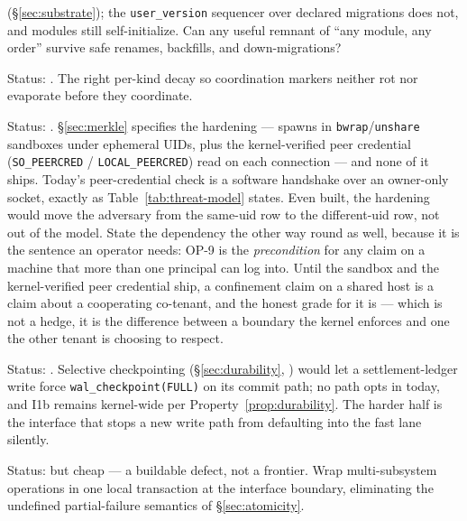 \documentclass[11pt,a4paper]{article}
\theoremstyle{definition}
\theoremstyle{remark}
\begin{document}
\begin{description}[leftmargin=2.2em,style=nextline]
(\S\ref{sec:substrate}); the \texttt{user\_version} sequencer over declared
migrations does not, and modules still self-initialize. Can any useful remnant of
``any module, any order'' survive safe renames, backfills, and down-migrations?
\item[$\bigstar$ OP-8 --- Stigmergic decay calibration.] Status: \Open. The right per-kind
decay so coordination markers neither rot nor evaporate before they coordinate.
\item[$\bigstar$ OP-9 --- Same-machine adversary.] Status: \Open. \S\ref{sec:merkle}
specifies the hardening --- spawns in \texttt{bwrap}/\texttt{unshare} sandboxes
under ephemeral UIDs, plus the kernel-verified peer credential
(\texttt{SO\_PEERCRED} / \texttt{LOCAL\_PEERCRED}) read on each connection --- and
none of it ships. Today's peer-credential check is a software handshake over an
owner-only socket, exactly as Table~\ref{tab:threat-model} states. Even built, the
hardening would move the adversary from the same-uid row to the different-uid row,
not out of the model. State the dependency the other way round as well, because it
is the sentence an operator needs: OP-9 is the \emph{precondition} for any
 claim on a machine that more than one principal can log into.
Until the sandbox and the kernel-verified peer credential ship, a confinement claim
on a shared host is a claim about a cooperating co-tenant, and the honest grade for
it is  --- which is not a hedge, it is the difference between
a boundary the kernel enforces and one the other tenant is choosing to respect.
\item[$\bigstar$ OP-10 --- Per-write-path durability.] Status: \Open. Selective
checkpointing (\S\ref{sec:durability}, \Designed) would let a settlement-ledger
write force \texttt{wal\_checkpoint(FULL)} on its commit path; no path opts in
today, and I1b remains \NotGuar{} kernel-wide per Property~\ref{prop:durability}.
The harder half is the interface that stops a new write path from defaulting into
the fast lane silently.
\item[$\bigstar$ OP-11 --- Cross-subsystem atomicity by default.] Status: \Open{} but cheap ---
a buildable defect, not a frontier. Wrap multi-subsystem operations in one local
transaction at the interface boundary, eliminating the undefined partial-failure
semantics of \S\ref{sec:atomicity}.
\end{description}

\end{document}
